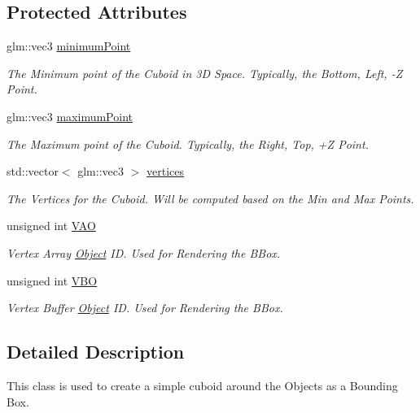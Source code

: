 \subsection*{Protected Attributes}
\begin{DoxyCompactItemize}
\item 
glm\+::vec3 \mbox{\hyperlink{classpiolot_1_1_bounding_box_a9e1b1896cdc55746ab9903241c358dc4}{minimum\+Point}}
\begin{DoxyCompactList}\small\item\em The Minimum point of the Cuboid in 3D Space. Typically, the Bottom, Left, -\/Z Point. \end{DoxyCompactList}\item 
glm\+::vec3 \mbox{\hyperlink{classpiolot_1_1_bounding_box_a4b6af7e1b8cb46c8967a8921146097bd}{maximum\+Point}}
\begin{DoxyCompactList}\small\item\em The Maximum point of the Cuboid. Typically, the Right, Top, +Z Point. \end{DoxyCompactList}\item 
std\+::vector$<$ glm\+::vec3 $>$ \mbox{\hyperlink{classpiolot_1_1_bounding_box_ae57572db987c9f1185ad73febc8fbc28}{vertices}}
\begin{DoxyCompactList}\small\item\em The Vertices for the Cuboid. Will be computed based on the Min and Max Points. \end{DoxyCompactList}\item 
unsigned int \mbox{\hyperlink{classpiolot_1_1_bounding_box_ad5ea73dcadf0d25c07cc8ff3761db4e3}{V\+AO}}
\begin{DoxyCompactList}\small\item\em Vertex Array \mbox{\hyperlink{classpiolot_1_1_object}{Object}} ID. Used for Rendering the B\+Box. \end{DoxyCompactList}\item 
unsigned int \mbox{\hyperlink{classpiolot_1_1_bounding_box_a4c8c26e00dff9f14709bc2803b38a0bf}{V\+BO}}
\begin{DoxyCompactList}\small\item\em Vertex Buffer \mbox{\hyperlink{classpiolot_1_1_object}{Object}} ID. Used for Rendering the B\+Box. \end{DoxyCompactList}\end{DoxyCompactItemize}


\subsection{Detailed Description}
This class is used to create a simple cuboid around the Objects as a Bounding Box. 

